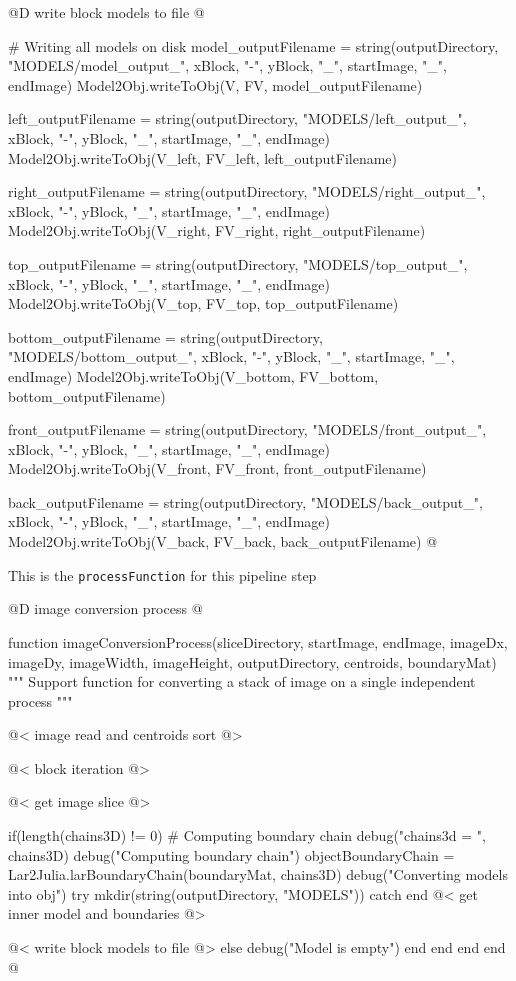 \documentclass[11pt,oneside]{article}	%
\begin{document}
@D write block models to file
@{# Writing all models on disk
model_outputFilename = string(outputDirectory, "MODELS/model_output_", xBlock,
				"-", yBlock, "_", startImage, "_", endImage)
Model2Obj.writeToObj(V, FV, model_outputFilename)

left_outputFilename = string(outputDirectory, "MODELS/left_output_", xBlock,
				"-", yBlock, "_", startImage, "_", endImage)
Model2Obj.writeToObj(V_left, FV_left, left_outputFilename)

right_outputFilename = string(outputDirectory, "MODELS/right_output_", xBlock,
				"-", yBlock, "_", startImage, "_", endImage)
Model2Obj.writeToObj(V_right, FV_right, right_outputFilename)

top_outputFilename = string(outputDirectory, "MODELS/top_output_", xBlock,
				"-", yBlock, "_", startImage, "_", endImage)
Model2Obj.writeToObj(V_top, FV_top, top_outputFilename)

bottom_outputFilename = string(outputDirectory, "MODELS/bottom_output_", xBlock,
				"-", yBlock, "_", startImage, "_", endImage)
Model2Obj.writeToObj(V_bottom, FV_bottom, bottom_outputFilename)

front_outputFilename = string(outputDirectory, "MODELS/front_output_", xBlock,
				"-", yBlock, "_", startImage, "_", endImage)
Model2Obj.writeToObj(V_front, FV_front, front_outputFilename)

back_outputFilename = string(outputDirectory, "MODELS/back_output_", xBlock,
				"-", yBlock, "_", startImage, "_", endImage)
Model2Obj.writeToObj(V_back, FV_back, back_outputFilename) @}

This is the \texttt{processFunction} for this pipeline step

@D image conversion process
@{function imageConversionProcess(sliceDirectory,
			      startImage, endImage,
			      imageDx, imageDy,
			      imageWidth, imageHeight,
			      outputDirectory,
			      centroids, boundaryMat)
  """
  Support function for converting a stack of image on a single
  independent process
  """

  @< image read and centroids sort @>
  
  @< block iteration @>

      @< get image slice @>
      
      if(length(chains3D) != 0)
        # Computing boundary chain
        debug("chains3d = ", chains3D)
        debug("Computing boundary chain")
        objectBoundaryChain = Lar2Julia.larBoundaryChain(boundaryMat, chains3D)
        debug("Converting models into obj")
        try
          mkdir(string(outputDirectory, "MODELS"))
        catch
        end
        @< get inner model and boundaries @>
        
        @< write block models to file @>
      else
        debug("Model is empty")
      end
    end
  end
end @}
\end{document}
